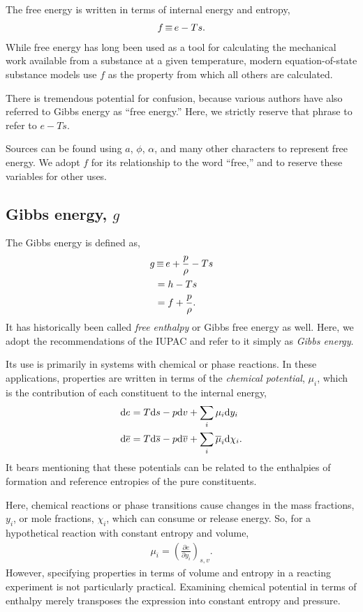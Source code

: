 The free energy is written in terms of internal energy and entropy,
\begin{align}
f \operatorname*{\equiv} e - Ts \label{eqn:intro:f}.
\end{align}
While free energy has long been used as a tool for calculating the mechanical work available from a substance at a given temperature, modern equation-of-state substance models use $f$ as the property from which all others are calculated.

There is tremendous potential for confusion, because various authors have also referred to Gibbs energy as ``free energy.''  Here, we strictly reserve that phrase to refer to $e - Ts$.

Sources can be found using $a$, $\phi$, $\alpha$, and many other characters to represent free energy.  We adopt $f$ for its relationship to the word ``free,'' and to reserve these variables for other uses.


\subsection{Gibbs energy, $g$}\label{sec:intro:g}

The Gibbs energy is defined as,
\begin{align}
g &\operatorname*{\equiv} e + \frac{p}{\rho} - Ts\label{eqn:intro:g}\\
 &=  h - Ts\nonumber\\
 &= f + \frac{p}{\rho}\nonumber.
\end{align}
It has historically been called \emph{free enthalpy} or Gibbs free energy as well.  Here, we adopt the recommendations of the IUPAC and refer to it simply as \emph{Gibbs energy}.

Its use is primarily in systems with chemical or phase reactions.  In these applications, properties are written in terms of the \emph{chemical potential}, $\mu_i$, which is the contribution of each constituent to the internal energy,
\begin{align*}
\mathrm{d} e &= T \mathrm{d} s - p \mathrm{d} v + \sum_i \mu_i \mathrm{d} y_i\\
\mathrm{d} \overline{e} &= T \mathrm{d} \overline{s} - p \mathrm{d} \overline{v} + \sum_i \overline{\mu}_i \mathrm{d} \chi_i.
\end{align*}
It bears mentioning that these potentials can be related to the enthalpies of formation and reference entropies of the pure constituents.

Here, chemical reactions or phase transitions cause changes in the mass fractions, $y_i$, or mole fractions, $\chi_i$, which can consume or release energy.  So, for a hypothetical reaction with constant entropy and volume,
\begin{align}
\mu_i = \left(\frac{\partial e}{\partial y_i}\right)_{s,v}.
\end{align}
However, specifying properties in terms of volume and entropy in a reacting experiment is not particularly practical.  Examining chemical potential in terms of enthalpy merely transposes the expression into constant entropy and pressure.


